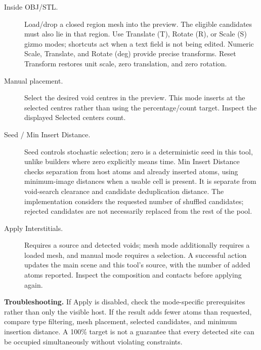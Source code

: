 \begin{description}
\item[Inside OBJ/STL.] Load/drop a closed region mesh into the preview. The eligible candidates must also lie in that region. Use Translate (T), Rotate (R), or Scale (S) gizmo modes; shortcuts act when a text field is not being edited. Numeric Scale, Translate, and Rotate (deg) provide precise transforms. Reset Transform restores unit scale, zero translation, and zero rotation.
\item[Manual placement.] Select the desired void centres in the preview. This mode inserts at the selected centres rather than using the percentage/count target. Inspect the displayed Selected centers count.
\item[Seed / Min Insert Distance.] Seed controls stochastic selection; zero is a deterministic seed in this tool, unlike builders where zero explicitly means time. Min Insert Distance checks separation from host atoms and already inserted atoms, using minimum-image distances when a usable cell is present. It is separate from void-search clearance and candidate deduplication distance. The implementation considers the requested number of shuffled candidates; rejected candidates are not necessarily replaced from the rest of the pool.
\item[Apply Interstitials.] Requires a source and detected voids; mesh mode additionally requires a loaded mesh, and manual mode requires a selection. A successful action updates the main scene and this tool's source, with the number of added atoms reported. Inspect the composition and contacts before applying again.
\end{description}
\textbf{Troubleshooting.} If Apply is disabled, check the mode-specific prerequisites rather than only the visible host. If the result adds fewer atoms than requested, compare type filtering, mesh placement, selected candidates, and minimum insertion distance. A 100\% target is not a guarantee that every detected site can be occupied simultaneously without violating constraints.
